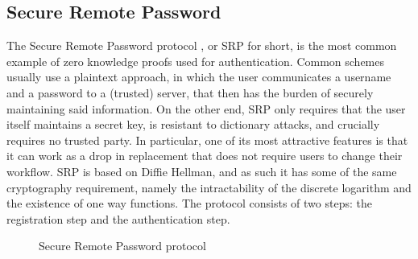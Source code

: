 \documentclass{article}
\begin{document}
\subsection{Secure Remote Password}
The Secure Remote Password protocol \cite{wuSecureRemotePassword1997}, or SRP for short, is the most common
example of zero knowledge proofs used for authentication. Common schemes usually use a plaintext approach,
in which the user communicates a username and a password to a (trusted) server, that then has the burden of securely maintaining said information.
On the other end, SRP only requires that
the user itself maintains a secret key, is resistant to dictionary attacks, and crucially requires no trusted party.
In particular, one of its most attractive features is that it can work as a drop in replacement that does not require users
to change their workflow.
SRP is based on Diffie Hellman, and as such it has some of the same cryptography requirement, namely the intractability
of the discrete logarithm and the existence of one way functions.
The protocol consists of two steps: the registration step and the authentication step.

\begin{figure}[H]
    \centering
    \caption{Secure Remote Password protocol}
    \label{srp}
\end{figure}
\end{document}

